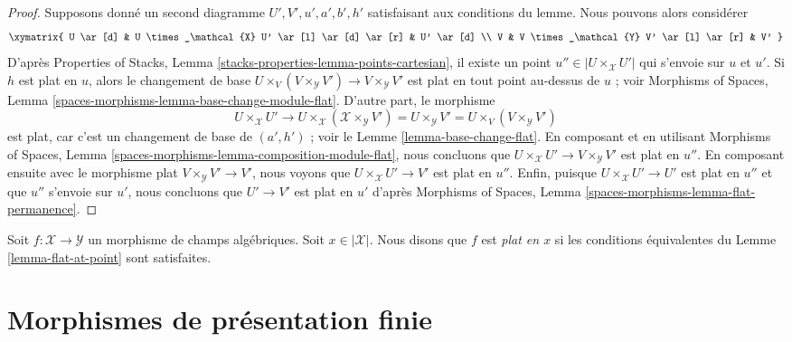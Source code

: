 \begin{proof}
Supposons donné un second diagramme $U', V', u', a', b', h'$ satisfaisant
aux conditions du lemme. Nous pouvons alors considérer
$$
\xymatrix{
U \ar[d] & U \times_\mathcal{X} U' \ar[l] \ar[d] \ar[r] & U' \ar[d] \\
V & V \times_\mathcal{Y} V' \ar[l] \ar[r] & V'
}
$$
D'après Properties of Stacks, Lemma
\ref{stacks-properties-lemma-points-cartesian}, il existe un point
$u'' \in |U \times_\mathcal{X} U'|$ qui s'envoie sur $u$ et $u'$.
Si $h$ est plat en $u$, alors le changement de base
$U \times_V (V \times_\mathcal{Y} V') \to V \times_\mathcal{Y} V'$
est plat en tout point au-dessus de $u$ ; voir Morphisms of Spaces, Lemma
\ref{spaces-morphisms-lemma-base-change-module-flat}. D'autre part, le
morphisme
$$
U \times_\mathcal{X} U' \to
U \times_\mathcal{X} (\mathcal{X} \times_\mathcal{Y} V') =
U \times_\mathcal{Y} V' =
U \times_V (V \times_\mathcal{Y} V')
$$
est plat, car c'est un changement de base de $(a', h')$ ; voir le
Lemme \ref{lemma-base-change-flat}. En composant et en utilisant Morphisms
of Spaces, Lemma \ref{spaces-morphisms-lemma-composition-module-flat}, nous
concluons que $U \times_\mathcal{X} U' \to V \times_\mathcal{Y} V'$ est plat
en $u''$. En composant ensuite avec le morphisme plat
$V \times_\mathcal{Y} V' \to V'$, nous voyons que
$U \times_\mathcal{X} U' \to V'$ est plat en $u''$. Enfin, puisque
$U \times_\mathcal{X} U' \to U'$ est plat en $u''$ et que $u''$ s'envoie
sur $u'$, nous concluons que $U' \to V'$ est plat en $u'$ d'après Morphisms
of Spaces, Lemma \ref{spaces-morphisms-lemma-flat-permanence}.
\end{proof}

\begin{definition}
\label{definition-flat-at-point}
Soit $f : \mathcal{X} \to \mathcal{Y}$ un morphisme de champs algébriques.
Soit $x \in |\mathcal{X}|$. Nous disons que $f$ est {\it plat en $x$} si les
conditions équivalentes du Lemme \ref{lemma-flat-at-point} sont satisfaites.
\end{definition}





\section{Morphismes de présentation finie}
\label{section-finite-presentation}

